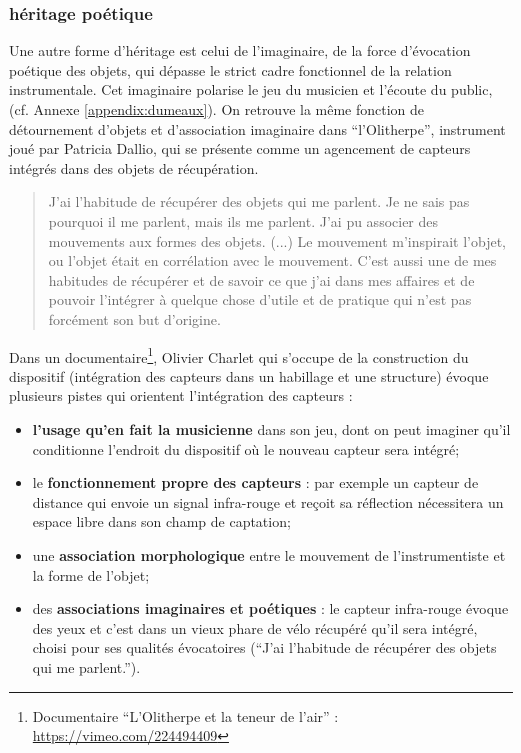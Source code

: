 \subsubsection{héritage poétique}

\noindent Une autre forme d'héritage est celui de l'imaginaire, de la force d'évocation poétique des objets, qui dépasse le strict cadre fonctionnel de la relation instrumentale. Cet imaginaire polarise le jeu du musicien et l'écoute du public,  (cf. Annexe \ref{appendix:dumeaux}). On retrouve la même fonction de détournement d'objets et d'association imaginaire dans ``l'Olitherpe'', instrument joué par Patricia Dallio, qui se présente comme un agencement de capteurs intégrés dans des objets de récupération. 

\begin{quotation}
	J'ai l'habitude de récupérer des objets qui me parlent. Je ne sais pas pourquoi il me parlent, mais ils me parlent. J'ai pu associer des mouvements aux formes des objets. (...) Le mouvement m'inspirait l'objet, ou l'objet était en corrélation avec le mouvement. C'est aussi une de mes habitudes de récupérer et de savoir ce que j'ai dans mes affaires et de pouvoir l'intégrer à quelque chose d'utile et de pratique qui n'est pas forcément son but d'origine.
\end{quotation}

\noindent Dans un documentaire\footnote{Documentaire ``L'Olitherpe et la teneur de l'air'' : \url{https://vimeo.com/224494409}}, Olivier Charlet qui s'occupe de la construction du dispositif (intégration des capteurs dans un habillage et une structure) évoque plusieurs pistes qui orientent l'intégration des capteurs : 
\vspace{-1em}
\begin{itemize}[noitemsep]
\item \textbf{l'usage qu'en fait la musicienne} dans son jeu, dont on peut imaginer qu'il conditionne l'endroit du dispositif où le nouveau capteur sera intégré; 
\item le \textbf{fonctionnement propre des capteurs} : par exemple un capteur de distance qui envoie un signal infra-rouge et reçoit sa réflection nécessitera un espace libre dans son champ de captation;
\item une \textbf{association morphologique} entre le mouvement de l'instrumentiste et la forme de l'objet;
\item des \textbf{associations imaginaires et poétiques} : le capteur infra-rouge évoque des yeux et c'est dans un vieux phare de vélo récupéré qu'il sera intégré, choisi pour ses qualités évocatoires (``J'ai l'habitude de récupérer des objets qui me parlent.'').
\end{itemize}

